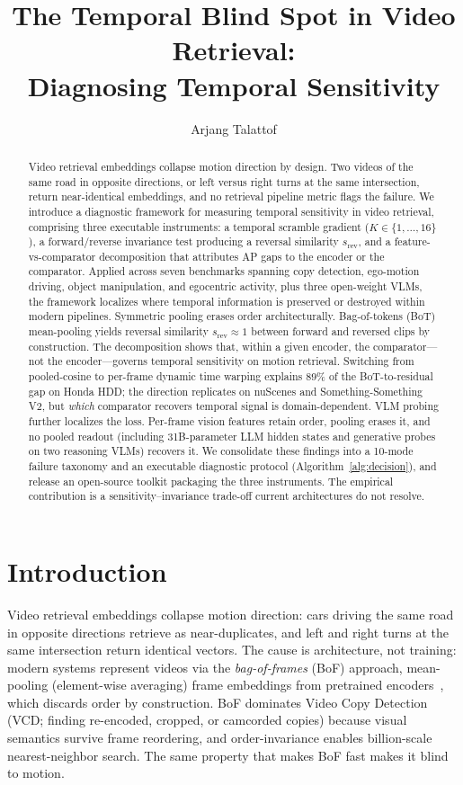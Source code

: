 \documentclass{article}
\title{The Temporal Blind Spot in Video Retrieval:\\Diagnosing Temporal Sensitivity}
\author{Arjang Talattof}
\theoremstyle{remark}
\begin{document}
\maketitle

\begin{abstract}
Video retrieval embeddings collapse motion direction by design. Two videos of the same
road in opposite directions, or left versus right turns at the same intersection,
return near-identical embeddings, and no retrieval pipeline metric flags the failure.
We introduce a diagnostic framework for measuring temporal sensitivity in video
retrieval, comprising three executable instruments: a temporal scramble gradient
($K\!\in\!\{1,\ldots,16\}$), a forward/reverse invariance test producing a reversal
similarity $s_\text{rev}$, and a feature-vs-comparator decomposition that attributes AP
gaps to the encoder or the comparator. Applied across seven benchmarks spanning copy
detection, ego-motion driving, object manipulation, and egocentric activity, plus three
open-weight VLMs, the framework localizes where temporal information is preserved or
destroyed within modern pipelines. Symmetric pooling erases order architecturally. Bag-of-tokens (BoT) mean-pooling yields
reversal similarity $s_\text{rev}\!\approx\!1$ between forward and reversed clips by
construction. The decomposition shows that, within a given encoder, the comparator---not
the encoder---governs temporal sensitivity on motion retrieval. Switching from pooled-cosine
to per-frame dynamic time warping explains 89\% of the BoT-to-residual gap on Honda HDD;
the direction replicates on nuScenes and Something-Something V2, but \emph{which}
comparator recovers temporal signal is domain-dependent. VLM probing further localizes the
loss. Per-frame vision features retain order, pooling erases it, and no pooled
readout (including 31B-parameter LLM hidden states and generative probes on two reasoning
VLMs) recovers it. We consolidate these findings into a 10-mode failure taxonomy and an
executable diagnostic protocol (Algorithm~\ref{alg:decision}), and release an open-source
toolkit packaging the three instruments. The empirical contribution is a
sensitivity--invariance trade-off current architectures do not resolve.
\end{abstract}

\section{Introduction}

Video retrieval embeddings collapse motion direction: cars driving the same road in opposite directions retrieve as near-duplicates, and left and right turns at the same intersection return identical vectors. The cause is architecture, not training: modern systems represent videos via the \emph{bag-of-frames} (BoF) approach, mean-pooling (element-wise averaging) frame embeddings from pretrained encoders~\cite{faiss, semdedup}, which discards order by construction. BoF dominates Video Copy Detection (VCD; finding re-encoded, cropped, or camcorded copies) because visual semantics survive frame reordering, and order-invariance enables billion-scale nearest-neighbor search. The same property that makes BoF fast makes it blind to motion.
\end{document}

